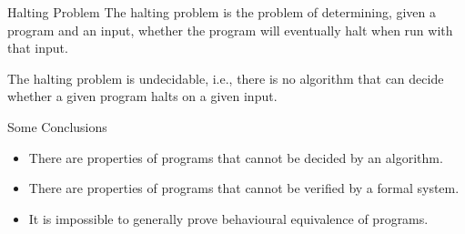 \documentclass{beamer}
\begin{document}
        \begin{frame}{Halting Problem}
          The halting problem is the problem of determining, given a program and an input, whether the program will eventually halt when run with that input.
          
          The halting problem is undecidable, i.e., there is no algorithm that can decide whether a given program halts on a given input.
        \end{frame}

        \begin{frame}{Some Conclusions}
          \begin{itemize}
            \item There are properties of programs that cannot be decided by an algorithm. 
            \item There are properties of programs that cannot be verified by a formal system.
            \item It is impossible to generally prove behavioural equivalence of programs.
          \end{itemize}
        
          
        \end{frame}



    
\end{document}
